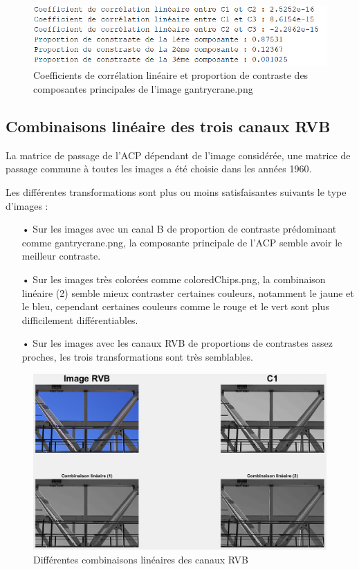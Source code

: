 \documentclass[a4paper,12pt]{article}
\theoremstyle{break}
\begin{document}
\begin{figure}[htbp]
	\centering
	\includegraphics{img/TP1_ex2_res.PNG}
	\caption{Coefficients de corrélation linéaire et proportion de contraste des composantes principales de l'image gantrycrane.png}
\end{figure}
\newpage

\subsection{Combinaisons linéaire des trois canaux RVB}

La matrice de passage de l'ACP dépendant de l'image considérée, une matrice de passage commune à toutes les images a été choisie dans les années 1960.

Les différentes transformations sont plus ou moins satisfaisantes suivants le type d'images : 
\begin{itemize}
\item[•] Sur les images avec un canal B de proportion de contraste prédominant comme gantrycrane.png, la composante principale de l'ACP semble avoir le meilleur contraste.
\item[•] Sur les images très colorées comme coloredChips.png, la combinaison linéaire (2) semble mieux contraster certaines couleurs, notamment le jaune et le bleu, cependant certaines couleurs comme le rouge et le vert sont plus difficilement différentiables.
\item[•] Sur les images avec les canaux RVB de proportions de contrastes assez proches, les trois transformations sont très semblables.
\end{itemize}

\begin{figure}[htbp]
	\centering
	\includegraphics[scale=0.55]{img/TP1_ex3_figure_gantrycrane.PNG}
	
	\caption{Différentes combinaisons linéaires des canaux RVB}
\end{figure}
\end{document}
